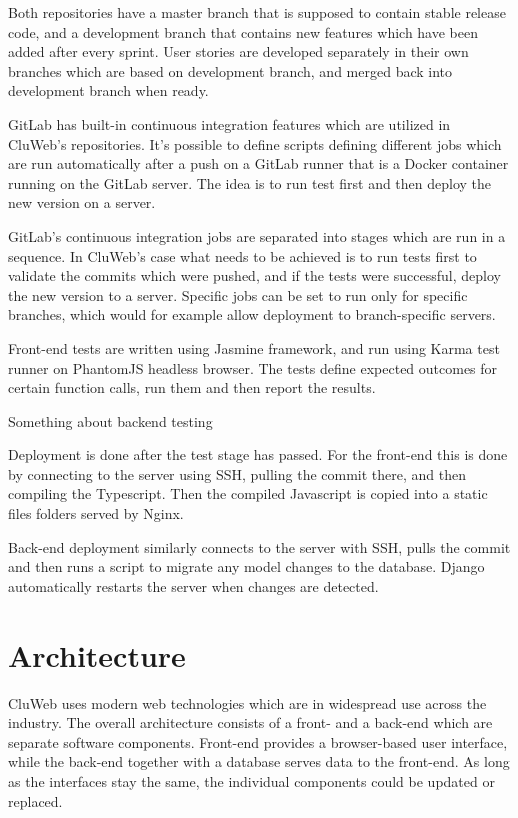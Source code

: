Both repositories have a master branch that is supposed to contain stable release code, and a development branch that contains new features which have been added after every sprint. User stories are developed separately in their own branches which are based on development branch, and merged back into development branch when ready.

GitLab has built-in continuous integration features which are utilized in CluWeb's repositories. It's possible to define scripts defining different jobs which are run automatically after a push on a GitLab runner that is a Docker container running on the GitLab server. The idea is to run test first and then deploy the new version on a server.

GitLab's continuous integration jobs are separated into stages which are run in a sequence. In CluWeb's case what needs to be achieved is to run tests first to validate the commits which were pushed, and if the tests were successful, deploy the new version to a server. Specific jobs can be set to run only for specific branches, which would for example allow deployment to branch-specific servers.

Front-end tests are written using Jasmine framework, and run using Karma test runner on PhantomJS headless browser. The tests define expected outcomes for certain function calls, run them and then report the results.

Something about backend testing

Deployment is done after the test stage has passed. For the front-end this is done by connecting to the server using SSH, pulling the commit there, and then compiling the Typescript. Then the compiled Javascript is copied into a static files folders served by Nginx.

Back-end deployment similarly connects to the server with SSH, pulls the commit and then runs a script to migrate any model changes to the database. Django automatically restarts the server when changes are detected.

\section{Architecture}
CluWeb uses modern web technologies which are in widespread use across the industry. The overall architecture consists of a front- and a back-end which are separate software components. Front-end provides a browser-based user interface, while the back-end together with a database serves data to the front-end. As long as the interfaces stay the same, the individual components could be updated or replaced.

